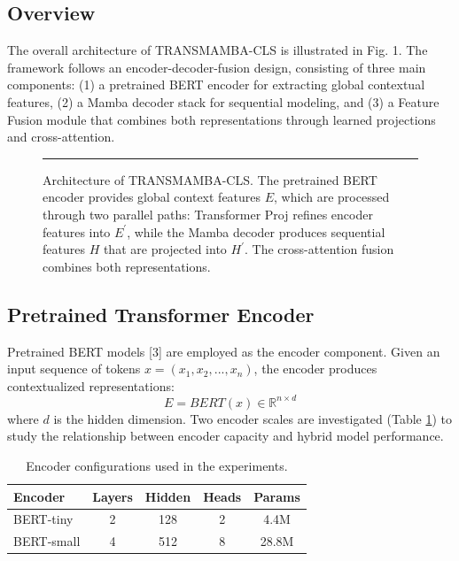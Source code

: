 \documentclass[10pt, conference]{IEEEtran}
\begin{document}
\subsection{Overview} %
The overall architecture of TRANSMAMBA-CLS is illustrated in Fig. 1. The framework follows an encoder-decoder-fusion design, consisting of three main components: (1) a pretrained BERT encoder for extracting global contextual features, (2) a Mamba decoder stack for sequential modeling, and (3) a Feature Fusion module that combines both representations through learned projections and cross-attention. %

\begin{figure}[htbp]
\centering
\rule{8cm}{5cm} %
\caption{Architecture of TRANSMAMBA-CLS. The pretrained BERT encoder provides global context features $E$, which are processed through two parallel paths: Transformer Proj refines encoder features into $E^{\prime}$, while the Mamba decoder produces sequential features $H$ that are projected into $H^{\prime}$. The cross-attention fusion combines both representations.} %
\label{fig:arch}
\end{figure}

\subsection{Pretrained Transformer Encoder} %
Pretrained BERT models [3] are employed as the encoder component. %
Given an input sequence of tokens $x=(x_{1},x_{2},...,x_{n})$, the encoder produces contextualized representations: %
\begin{equation}
E = BERT(x) \in \mathbb{R}^{n\times d} %
\end{equation}
where $d$ is the hidden dimension. Two encoder scales are investigated (Table \ref{tab:encoder}) to study the relationship between encoder capacity and hybrid model performance. %

\begin{table}[htbp]
\caption{Encoder configurations used in the experiments.} %
\label{tab:encoder}
\centering
\begin{tabular}{lcccc}
\toprule
\textbf{Encoder} & \textbf{Layers} & \textbf{Hidden} & \textbf{Heads} & \textbf{Params} \\ %
\midrule
BERT-tiny & 2 & 128 & 2 & 4.4M \\ %
BERT-small & 4 & 512 & 8 & 28.8M \\ %
\bottomrule
\end{tabular}
\end{table}
\end{document}
